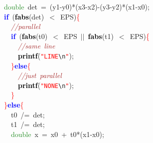 {{\mbox{}\ \ \textcolor{ForestGreen}{double}\ det\ \textcolor{BrickRed}{=}\ \textcolor{BrickRed}{(}y1\textcolor{BrickRed}{-}y0\textcolor{BrickRed}{)*(}x3\textcolor{BrickRed}{-}x2\textcolor{BrickRed}{)-(}y3\textcolor{BrickRed}{-}y2\textcolor{BrickRed}{)*(}x1\textcolor{BrickRed}{-}x0\textcolor{BrickRed}{);} \\
\mbox{}\ \ \textbf{\textcolor{Blue}{if}}\ \textcolor{BrickRed}{(}\textbf{\textcolor{Black}{fabs}}\textcolor{BrickRed}{(}det\textcolor{BrickRed}{)}\ \textcolor{BrickRed}{$<$}\ EPS\textcolor{BrickRed}{)}\textcolor{Red}{\{} \\
\mbox{}\ \ \ \ \textit{\textcolor{Brown}{//parallel}} \\
\mbox{}\ \ \ \ \textbf{\textcolor{Blue}{if}}\ \textcolor{BrickRed}{(}\textbf{\textcolor{Black}{fabs}}\textcolor{BrickRed}{(}t0\textcolor{BrickRed}{)}\ \textcolor{BrickRed}{$<$}\ EPS\ \textcolor{BrickRed}{$|$$|$}\ \textbf{\textcolor{Black}{fabs}}\textcolor{BrickRed}{(}t1\textcolor{BrickRed}{)}\ \textcolor{BrickRed}{$<$}\ EPS\textcolor{BrickRed}{)}\textcolor{Red}{\{} \\
\mbox{}\ \ \ \ \ \ \textit{\textcolor{Brown}{//same\ line}} \\
\mbox{}\ \ \ \ \ \ \textbf{\textcolor{Black}{printf}}\textcolor{BrickRed}{(}\texttt{\textcolor{Red}{"{}LINE}}\texttt{\textcolor{CarnationPink}{\textbackslash{}n}}\texttt{\textcolor{Red}{"{}}}\textcolor{BrickRed}{);} \\
\mbox{}\ \ \ \ \textcolor{Red}{\}}\textbf{\textcolor{Blue}{else}}\textcolor{Red}{\{} \\
\mbox{}\ \ \ \ \ \ \textit{\textcolor{Brown}{//just\ parallel}} \\
\mbox{}\ \ \ \ \ \ \textbf{\textcolor{Black}{printf}}\textcolor{BrickRed}{(}\texttt{\textcolor{Red}{"{}NONE}}\texttt{\textcolor{CarnationPink}{\textbackslash{}n}}\texttt{\textcolor{Red}{"{}}}\textcolor{BrickRed}{);} \\
\mbox{}\ \ \ \ \textcolor{Red}{\}} \\
\mbox{}\ \ \textcolor{Red}{\}}\textbf{\textcolor{Blue}{else}}\textcolor{Red}{\{} \\
\mbox{}\ \ \ \ t0\ \textcolor{BrickRed}{/=}\ det\textcolor{BrickRed}{;} \\
\mbox{}\ \ \ \ t1\ \textcolor{BrickRed}{/=}\ det\textcolor{BrickRed}{;} \\
\mbox{}\ \ \ \ \textcolor{ForestGreen}{double}\ x\ \textcolor{BrickRed}{=}\ x0\ \textcolor{BrickRed}{+}\ t0\textcolor{BrickRed}{*(}x1\textcolor{BrickRed}{-}x0\textcolor{BrickRed}{);} \\
}}
